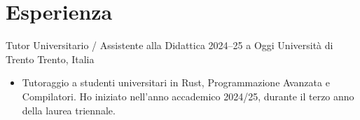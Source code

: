 \section{Esperienza}

\cvexperience
  {Tutor Universitario / Assistente alla Didattica}
  {2024--25 a Oggi}
  {Università di Trento}
  {Trento, Italia}
  {
    \begin{itemize}
      \item Tutoraggio a studenti universitari in Rust, Programmazione Avanzata e Compilatori. Ho iniziato nell'anno accademico 2024/25, durante il terzo anno della laurea triennale.
    \end{itemize}
  }

